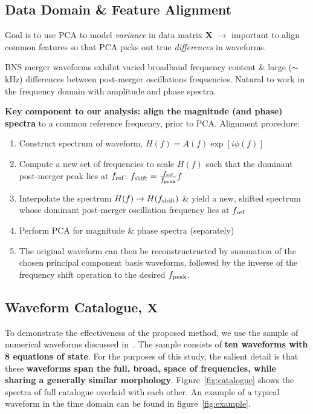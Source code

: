 \documentclass[a0,landscape]{a0poster}
\newcommand{\matr}[1]{\mathbf{#1}}
\begin{document}
\begin{multicols}{4}
\subsection*{\centering Data Domain \& Feature Alignment}
Goal is to use PCA to model \emph{variance} in data matrix $\matr{X}$
$\rightarrow$ important to align common features so that PCA picks out true
\emph{differences} in waveforms.

BNS merger waveforms exhibit varied broadband frequency content \& large
($\sim$\,kHz) differences between post-merger oscillations frequencies.  Natural
to work in the frequency domain with amplitude and phase spectra.

{\bf Key component to our analysis: align the magnitude (and phase) spectra} to
a common reference frequency, prior to PCA.   Alignment procedure:
\begin{enumerate}
    \item Construct spectrum of waveform, $H(f) = A(f)\exp[i\phi(f)]$
    \item Compute a new set of frequencies to scale $H(f)$ such that the
        dominant post-merger peak lies at $f_{\rm ref}$:
            $f_{\rm shift} = \frac{f_{\rm ref}}{f_{\rm peak}}  f$
    \item Interpolate the spectrum $H(f)\rightarrow H(f_{\rm shift})$ \& yield a
        new, shifted spectrum whose dominant post-merger oscillation frequency
        lies at $f_{\rm ref}$
    \item Perform PCA for magnitude \& phase spectra (separately)
    \item The original waveform can then be reconstructructed by summation of
        the chosen principal component basis waveforms, followed by the inverse
        of the frequency shift operation to the desired $f_{\rm peak}$.
\end{enumerate}

\subsection*{\centering Waveform Catalogue, $\matr{X}$}
To demonstrate the effectiveness of the proposed method, we use the sample of
numerical waveforms discussed in~\cite{2014PhRvD..90f2004C}.  The sample
consists of {\bf ten waveforms with 8 equations of state}.  For the purposes of this
study, the salient detail is that these {\bf waveforms span the full, broad, space of
frequencies, while sharing a generally similar morphology}.
Figure~\ref{fig:catalogue} shows the spectra of full catalogue overlaid with
each other.  An example of a typical waveform in the time domain can be found in
figure~\ref{fig:example}.


\end{multicols}
\end{document}
